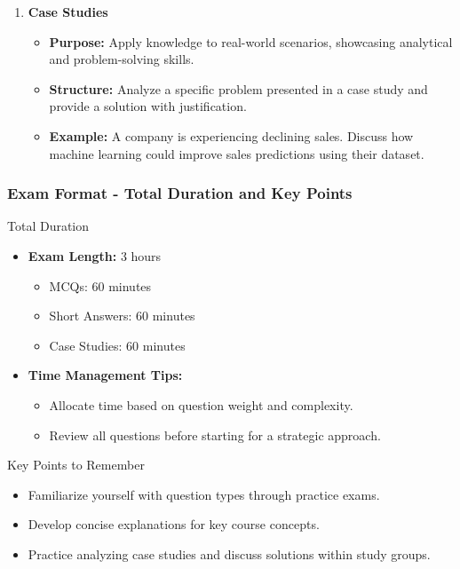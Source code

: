 \documentclass[aspectratio=169]{beamer}
\begin{document}
\begin{frame}[fragile]
\begin{enumerate}
        \item \textbf{Case Studies}
            \begin{itemize}
                \item \textbf{Purpose:} Apply knowledge to real-world scenarios, showcasing analytical and problem-solving skills.
                \item \textbf{Structure:} Analyze a specific problem presented in a case study and provide a solution with justification.
                \item \textbf{Example:} A company is experiencing declining sales. Discuss how machine learning could improve sales predictions using their dataset.
            \end{itemize}
    \end{enumerate}
\end{frame}

\begin{frame}[fragile]
    \frametitle{Exam Format - Total Duration and Key Points}
    \begin{block}{Total Duration}
        \begin{itemize}
            \item \textbf{Exam Length:} 3 hours
            \begin{itemize}
                \item MCQs: 60 minutes
                \item Short Answers: 60 minutes
                \item Case Studies: 60 minutes
            \end{itemize}
            \item \textbf{Time Management Tips:}
                \begin{itemize}
                    \item Allocate time based on question weight and complexity.
                    \item Review all questions before starting for a strategic approach.
                \end{itemize}
        \end{itemize}
    \end{block}
    
    \begin{block}{Key Points to Remember}
        \begin{itemize}
            \item Familiarize yourself with question types through practice exams.
            \item Develop concise explanations for key course concepts.
            \item Practice analyzing case studies and discuss solutions within study groups.
        \end{itemize}
    \end{block}
\end{frame}
\end{document}
